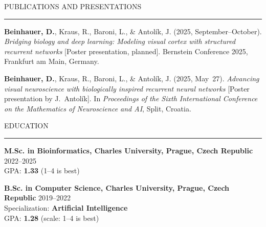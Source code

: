 \documentclass{resume} %
\renewenvironment{rSection}[1]{
\sectionskip
\textcolor{CarnegieMellonRed}{\MakeUppercase{#1}}
\sectionlineskip
\hrule
\begin{list}{}{
\setlength{\leftmargin}{1.5em}
}
\item[]
}{
\end{list}
}
\begin{document}
\begin{rSection}{Publications and Presentations}

\begin{enumerate}[leftmargin=*, label={[\arabic*]}] \itemsep -6pt

\item \textbf{Beinhauer, D.}, Kraus, R., Baroni, L., \& Antolík, J. (2025, September--October). 
\textit{Bridging biology and deep learning: Modeling visual cortex with structured recurrent networks} [Poster presentation, planned]. 
Bernstein Conference 2025, Frankfurt am Main, Germany.

\item \textbf{Beinhauer, D.}, Kraus, R., Baroni, L., \& Antolík, J. (2025, May~27). 
\textit{Advancing visual neuroscience with biologically inspired recurrent neural networks} [Poster presentation by J.~Antolík]. 
In \textit{Proceedings of the Sixth International Conference on the Mathematics of Neuroscience and AI}, Split, Croatia.

\end{enumerate}

\end{rSection}

\newpage

\begin{rSection}{Education}
{\bf \large M.Sc. in Bioinformatics, Charles University, Prague, Czech Republic} \hfill {2022--2025} \\ 
GPA: \textbf{1.33} (1--4 \vline {} is best)  \hfill

{\bf \large B.Sc. in Computer Science, Charles University, Prague, Czech Republic} \hfill {2019--2022} \\
Specialization: \textbf{Artificial Intelligence} \\
GPA: \textbf{1.28} (scale: 1--4 \vline {} is best)


\end{rSection}


\end{document}
